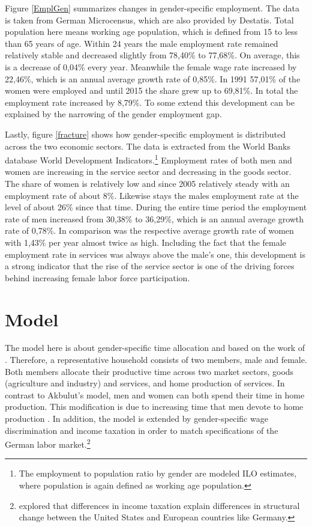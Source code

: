 \documentclass[a4paper,12pt]{article}
\begin{document}
Figure \ref{EmplGen} summarizes changes in gender-specific employment. The data is taken from German Microcensus, which are also provided by Destatis. Total population here means working age population, which is defined from 15 to less than 65 years of age. Within 24 years the male employment rate remained relatively stable and decreased slightly from 78,40\% to 77,68\%. On average, this is a decrease of 0,04\% every year. Meanwhile the female wage rate increased by 22,46\%, which is an annual average growth rate of 0,85\%. In 1991 57,01\% of the women were employed and until 2015 the share grew up to 69,81\%. In total the employment rate increased by 8,79\%. To some extend this development can be explained by the narrowing of the gender employment gap.




Lastly, figure \ref{fracture} shows how gender-specific employment is distributed across the two economic sectors. The data is extracted from the World Banks database World Development Indicators.\footnote{The employment to population ratio by gender are modeled ILO estimates, where population is again defined as working age population.} Employment rates of both men and women are increasing in the service sector and decreasing in the goods sector. The share of women is relatively low and since 2005 relatively steady with an employment rate of about 8\%. Likewise stays the males employment rate at the level of about 26\% since that time. During the entire time period the employment rate of men increased from 30,38\% to 36,29\%, which is an annual average growth rate of 0,78\%. In comparison was the respective average growth rate of women with 1,43\% per year almost twice as high. Including the fact that the female employment rate in services was always above the male's one, this development is a strong indicator that the rise of the service sector is one of the driving forces behind increasing female labor force participation. 

\newpage

\section{Model}

The model here is about gender-specific time allocation and based on the work of \citet{Akbulut:11}. Therefore, a representative household consists of two members, male and female. Both members allocate their productive time across two market sectors, goods (agriculture and industry) and services, and home production of services. In contrast to Akbulut's model, men and women can both spend their time in home production. This modification is due to increasing time that men devote to home production \citep{Ramey:2008}.
In addition, the model is extended by gender-specific wage discrimination and income taxation in order to match specifications of the German labor market.\footnote{\citet{Rogerson:2008} explored that differences in income taxation explain differences in structural change between the United States and European countries like Germany.}
\end{document}
